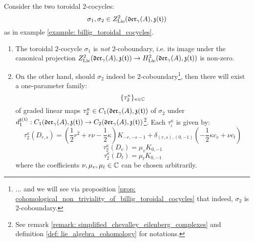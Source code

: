         \begin{lemma} \label{lemma: cohomological_non_triviality_of_billig_toroidal_cocycles_explicit_formula}
            Consider the two toroidal $2$-cocycles:
                $$\sigma_1, \sigma_2 \in Z^2_{\mathrm{Lie}}(\mathfrak{der}_{\gamma}(A), \mathfrak{z}(\mathfrak{t}))$$
            as in example \ref{example: billig_toroidal_cocycles}.
            \begin{enumerate}
                \item The toroidal $2$-cocycle $\sigma_1$ is \textit{not} $2$-coboundary, i.e. its image under the canonical projection $Z^2_{\mathrm{Lie}}(\mathfrak{der}_{\gamma}(A), \mathfrak{z}(\mathfrak{t}) ) \to H^2_{\mathrm{Lie}}(\mathfrak{der}_{\gamma}(A), \mathfrak{z}(\mathfrak{t}) )$ is non-zero.
                \item On the other hand, should $\sigma_2$ indeed be $2$-coboundary\footnote{... and we will see via proposition \ref{prop: cohomological_non_triviality_of_billig_toroidal_cocycles} that indeed, $\sigma_2$ is $2$-coboundary.}, then there will exist a one-parameter family:
                    $$\{\tau_2^{\kappa}\}_{\kappa \in \mathbb{C}}$$
                of graded linear maps $\tau_2^{\kappa} \in C_1(\mathfrak{der}_{\gamma}(A), \mathfrak{z}(\mathfrak{t}))$ of $\sigma_2$ under $d_1^{\mathfrak{z}(\mathfrak{t})}: C_1(\mathfrak{der}_{\gamma}(A), \mathfrak{z}(\mathfrak{t})) \to C_2(\mathfrak{der}_{\gamma}(A), \mathfrak{z}(\mathfrak{t}))$\footnote{See remark \ref{remark: simplified_chevalley_eilenberg_complexes} and definition \ref{def: lie_algebra_cohomology} for notations.}. Each $\tau_i^{\kappa}$ is given by:
                    $$\tau_2^{\kappa}(D_{r, s}) = \left( \frac12 r^2 + r\nu - \frac12 \kappa \right) K_{-r, -s - 1} + \delta_{(r, s), (0, -1)} \left( -\frac12 \kappa c_v + \nu c_t\right)$$
                    $$\tau_2^{\kappa}(D_v) = \mu_v K_{0, -1}$$
                    $$\tau_2^{\kappa}(D_t) = \mu_t K_{0, -1}$$
                where the coefficients $\nu, \mu_v, \mu_t \in \mathbb{C}$ can be chosen arbitrarily.
            \end{enumerate}
        \end{lemma}

